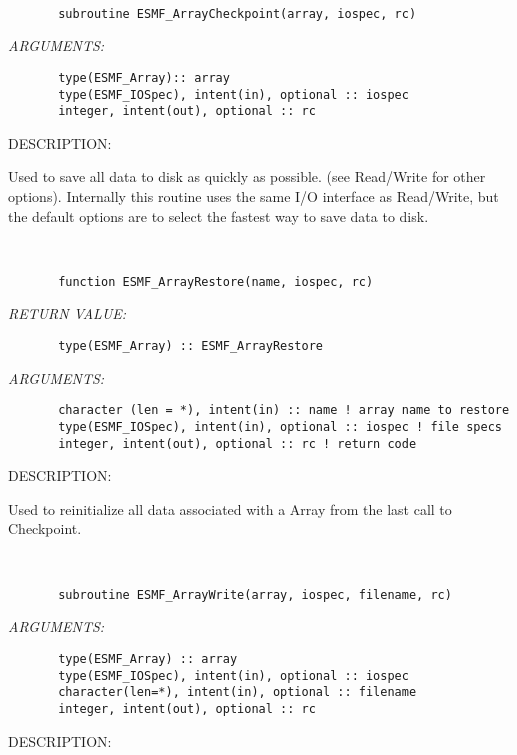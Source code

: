 
\mbox{}\hrulefill\ 
 

\begin{verbatim}       subroutine ESMF_ArrayCheckpoint(array, iospec, rc)\end{verbatim}{\em ARGUMENTS:}
\begin{verbatim}       type(ESMF_Array):: array
       type(ESMF_IOSpec), intent(in), optional :: iospec
       integer, intent(out), optional :: rc\end{verbatim}
{\sf DESCRIPTION:\\ }


   Used to save all data to disk as quickly as possible.
   (see Read/Write for other options). Internally this routine uses the
   same I/O interface as Read/Write, but the default options are to
   select the fastest way to save data to disk.
   
 
\mbox{}\hrulefill\ 
 

\begin{verbatim}       function ESMF_ArrayRestore(name, iospec, rc)\end{verbatim}{\em RETURN VALUE:}
\begin{verbatim}       type(ESMF_Array) :: ESMF_ArrayRestore\end{verbatim}{\em ARGUMENTS:}
\begin{verbatim}       character (len = *), intent(in) :: name ! array name to restore
       type(ESMF_IOSpec), intent(in), optional :: iospec ! file specs
       integer, intent(out), optional :: rc ! return code\end{verbatim}
{\sf DESCRIPTION:\\ }


   Used to reinitialize
   all data associated with a Array from the last call to Checkpoint.
   
 
\mbox{}\hrulefill\ 
 

\begin{verbatim}       subroutine ESMF_ArrayWrite(array, iospec, filename, rc)\end{verbatim}{\em ARGUMENTS:}
\begin{verbatim}       type(ESMF_Array) :: array
       type(ESMF_IOSpec), intent(in), optional :: iospec
       character(len=*), intent(in), optional :: filename
       integer, intent(out), optional :: rc\end{verbatim}
{\sf DESCRIPTION:\\ }


